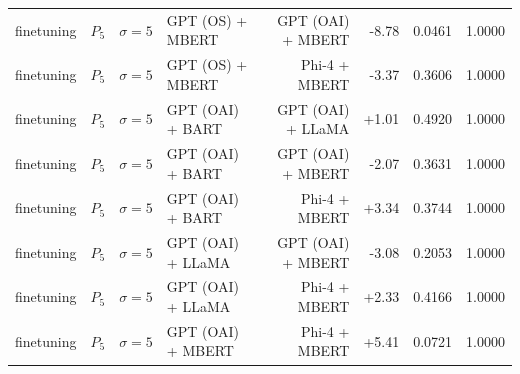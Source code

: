 \begin{table}[htbp]
\begin{tabular*}{\textwidth}{@{\extracolsep{\fill}}llllrrrl}
finetuning & $P_5$ & $\sigma{=}5$ & GPT (OS) + MBERT & GPT (OAI) + MBERT & -8.78 & 0.0461 & 1.0000 \\
finetuning & $P_5$ & $\sigma{=}5$ & GPT (OS) + MBERT & Phi-4 + MBERT & -3.37 & 0.3606 & 1.0000 \\
finetuning & $P_5$ & $\sigma{=}5$ & GPT (OAI) + BART & GPT (OAI) + LLaMA & +1.01 & 0.4920 & 1.0000 \\
finetuning & $P_5$ & $\sigma{=}5$ & GPT (OAI) + BART & GPT (OAI) + MBERT & -2.07 & 0.3631 & 1.0000 \\
finetuning & $P_5$ & $\sigma{=}5$ & GPT (OAI) + BART & Phi-4 + MBERT & +3.34 & 0.3744 & 1.0000 \\
finetuning & $P_5$ & $\sigma{=}5$ & GPT (OAI) + LLaMA & GPT (OAI) + MBERT & -3.08 & 0.2053 & 1.0000 \\
finetuning & $P_5$ & $\sigma{=}5$ & GPT (OAI) + LLaMA & Phi-4 + MBERT & +2.33 & 0.4166 & 1.0000 \\
finetuning & $P_5$ & $\sigma{=}5$ & GPT (OAI) + MBERT & Phi-4 + MBERT & +5.41 & 0.0721 & 1.0000 \\
\hline
\end{tabular*}
\end{table}
